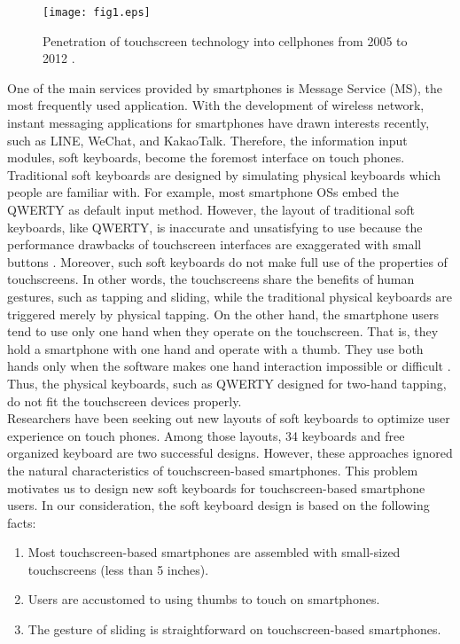 \documentclass{singlecol-new}
\theoremstyle{TH}{
\newtheorem{lemma}{Lemma}
\newtheorem{theorem}[lemma]{Theorem}
\newtheorem{corrolary}[lemma]{Corrolary}
\newtheorem{conjecture}[lemma]{Conjecture}
\newtheorem{proposition}[lemma]{Proposition}
\newtheorem{claim}[lemma]{Claim}
\newtheorem{stheorem}[lemma]{Wrong Theorem}
\newtheorem{algorithm}{Algorithm}
}
\theoremstyle{THrm}{
\newtheorem{definition}{Definition}[section]
\newtheorem{question}{Question}[section]
\newtheorem{remark}{Remark}
\newtheorem{scheme}{Scheme}
}
\theoremstyle{THhit}{
\newtheorem{case}{Case}[section]
}
\begin{document}
\begin{figure}
  \centering
  \caption{Penetration of touchscreen technology into cellphones from 2005 to 2012 \citep{stranal}.}\label{fig.intro}
  \texttt{[image: fig1.eps]}
\end{figure}

One of the main services provided by smartphones is Message Service (MS), the most frequently used application. With the development of wireless network, instant messaging applications for smartphones have drawn interests recently, such as LINE, WeChat, and KakaoTalk. Therefore, the information input modules, soft keyboards, become the foremost interface on touch phones. Traditional soft keyboards are designed by simulating physical keyboards which people are familiar with. For example, most smartphone OSs embed the QWERTY as default input method. However, the layout of traditional soft keyboards, like QWERTY, is inaccurate and unsatisfying to use because the performance drawbacks of touchscreen interfaces are exaggerated with small buttons \citep{parikh2012negative}. Moreover, such soft keyboards do not make full use of the properties of touchscreens. In other words, the touchscreens share the benefits of human gestures, such as tapping and sliding, while the traditional physical keyboards are triggered merely by physical tapping. On the other hand, the smartphone users tend to use only one hand when they operate on the touchscreen. That is, they hold a smartphone with one hand and operate with a thumb. They use both hands only when the software makes one hand interaction impossible or difficult \citep{park2010touch}. Thus, the physical keyboards, such as QWERTY designed for two-hand tapping, do not fit the touchscreen devices properly. \\

Researchers have been seeking out new layouts of soft keyboards to optimize user experience on touch phones. Among those layouts, 34 keyboards and free organized keyboard are two successful designs. However, these approaches ignored the natural characteristics of touchscreen-based smartphones. This problem motivates us to design new soft keyboards for touchscreen-based smartphone users. In our consideration, the soft keyboard design is based on the following facts:
\begin{enumerate}
  \item Most touchscreen-based smartphones are assembled with small-sized touchscreens (less than 5 inches).
  \item Users are accustomed to using thumbs to touch on smartphones.
  \item The gesture of sliding is straightforward on touchscreen-based smartphones.
\end{enumerate}
\end{document}
